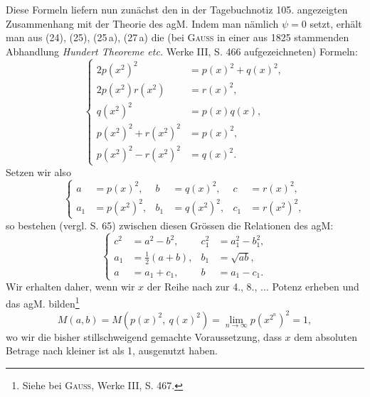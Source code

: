 Diese Formeln liefern nun zunächst den in der Tagebuchnotiz 105. angezeigten Zusammenhang mit der Theorie des agM. Indem man nämlich
\(\psi=0\) setzt, erhält man aus (24), (25), (25\,a), (27\,a) die (bei \textsc{Gauss} in einer
aus 1825 stammenden Abhandlung \textit{Hundert Theoreme etc.} Werke III, S. 466
aufgezeichneten) Formeln:
\begingroup\makeatletter\tagsleft@true\let\veqno\leqno\makeatother
\begin{equation*}
\left\{\begin{aligned}
2p(x^2)^2&=p(x)^2+q(x)^2,\\
2p(x^2)r(x^2)&=r(x)^2,\\
q(x^2)^2&=p(x)q(x),\\
p(x^2)^2+r(x^2)^2&=p(x)^2,\\
p(x^2)^2-r(x^2)^2&=q(x)^2.
\end{aligned}\right.\tag{28}
\end{equation*}
\endgroup
\clearpage{}
\noindent Setzen wir also
\begingroup\makeatletter\tagsleft@true\let\veqno\leqno\makeatother
\begin{equation*}
\left\{\begin{aligned}
a&=p(x)^2,& b&=q(x)^2,& c&=r(x)^2,\\
a_1&=p(x^2)^2,& b_1&=q(x^2)^2,& c_1&=r(x^2)^2,
\end{aligned}\right.\tag{29}
\end{equation*}
\endgroup
\noindent so bestehen (vergl. S. 65) zwischen diesen Grössen die Relationen des agM:
\begingroup\makeatletter\tagsleft@true\let\veqno\leqno\makeatother
\begin{equation*}
\left\{\begin{aligned}
c^2&=a^2-b^2,& c_1^2&=a_1^2-b_1^2,\\
a_1&=\tfrac12(a+b),& b_1&=\sqrt{ab},\\
a&=a_1+c_1,& b&=a_1-c_1.
\end{aligned}\right.\tag{28\,a}
\end{equation*}
\endgroup
\noindent Wir erhalten daher, wenn wir \(x\) der Reihe nach zur 4., 8., \(\ldots\) Potenz erheben und das agM. bilden\footnote{Siehe bei \textsc{Gauss}, Werke III, S. 467.}
\begingroup\makeatletter\tagsleft@true\let\veqno\leqno\makeatother
\begin{equation*}
M(a,b)=M(p(x)^2,\ q(x)^2)=\lim_{n\to\infty}p(x^{2^n})^2=1,\tag{30}
\end{equation*}
\endgroup
\noindent wo wir die bisher stillschweigend gemachte Voraussetzung, dass \(x\) dem absoluten Betrage nach kleiner ist als 1, ausgenutzt haben.

